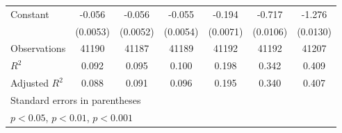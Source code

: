 {\begin{tabular}{l*{6}{c}}
Constant            &      -0.056\sym{***}&      -0.056\sym{***}&      -0.055\sym{***}&      -0.194\sym{***}&      -0.717\sym{***}&      -1.276\sym{***}\\
                    &    (0.0053)         &    (0.0052)         &    (0.0054)         &    (0.0071)         &    (0.0106)         &    (0.0130)         \\
\midrule
Observations        &       41190         &       41187         &       41189         &       41192         &       41192         &       41207         \\
\(R^{2}\)           &       0.092         &       0.095         &       0.100         &       0.198         &       0.342         &       0.409         \\
Adjusted \(R^{2}\)  &       0.088         &       0.091         &       0.096         &       0.195         &       0.340         &       0.407         \\
\bottomrule
\multicolumn{7}{l}{\footnotesize Standard errors in parentheses}\\
\multicolumn{7}{l}{\footnotesize \sym{*} \(p<0.05\), \sym{**} \(p<0.01\), \sym{***} \(p<0.001\)}\\
\end{tabular}
}
